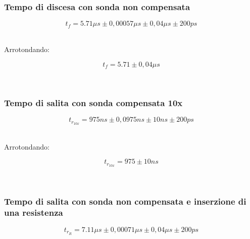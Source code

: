 \documentclass[a4paper]{article}
\begin{document}
\subsubsection{Tempo di discesa con sonda non compensata}
\begin{Large}
	\begin{equation}
  		{t_f}= 5.71\mu s \pm 0,00057\mu s \pm0,04\mu s \pm200ps
	\end{equation}
\end{Large}\\

Arrotondando: 

\begin{Large}
	\begin{equation}
  		{t_f}= 5.71\pm 0,04 \mu s
	\end{equation}
\end{Large}\\

\subsubsection{Tempo di salita con sonda compensata 10x}

\begin{Large}
	\begin{equation}
		{t_{r_{10x}}}= 975ns \pm 0,0975ns \pm10ns \pm200ps
	\end{equation}
\end{Large}\\

Arrotondando: 

\begin{Large}
	\begin{equation}
		{t_{r_{10x}}}= 975\pm 10 ns
	\end{equation}
\end{Large}\\

\subsubsection{Tempo di salita con sonda non compensata e inserzione di una resistenza}

\begin{Large}
	\begin{equation}
		t_{r_R}= 7.11\mu s \pm 0,00071\mu s \pm0,04\mu s \pm200ps
	\end{equation}
\end{Large}\\
\end{document}
